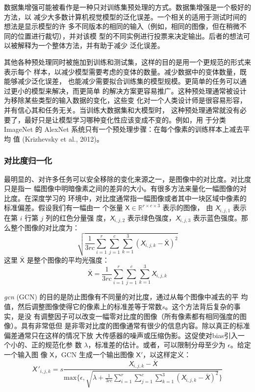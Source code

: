 数据集增强可能被看作是一种只对训练集预处理的方式。数据集增强是一个极好的方法，以
减少大多数计算机视觉模型的泛化误差。一个相关的适用于测试时间的想法是显示模型的许
多不同版本的相同的输入（例如，相同的图像，但在稍微不同的位置进行裁切），并对该模
型的不同实例进行投票来决定输出。后者的想法可以被解释为一个整体方法，并有助于减少
泛化误差。

其他各种预处理同时被施加到训练和测试集，这样的目的是用一个更规范的形式来表示每个
样本，以减少模型需要考虑的变体的数量。减少数据中的变体数量，既能够减少泛化误差，
也能减少需要拟合训练集的模型规模。更简单的任务可以通过更小的模型来解决，而更简单
的解决方案更容易推广。这种预处理通常被设计为移除某些类型的输入数据的变化，这些变
化对一个人类设计师是很容易形容，并有信心其和任务无关。当训练大数据集和大模型时，
这种预处理通常就没有必要了，最好只是让模型学习哪种变化性应该变成不变的。例如，用
于分类 ImageNet 的 AlexNet 系统只有一个预处理步骤：在每个像素的训练样本上减去平均
值 (Krizhevsky et al., 2012)。

\subsubsection{对比度归一化}
\label{subsubsec:contrast_nomalization}

最明显的、对许多任务可以安全移除的变化来源之一，是图像中的对比度。对比度只是指一
幅图像中明暗像素之间的差异的大小。有很多方法来量化一幅图像的对比度。在深度学习的
环境中，对比度通常指一幅图像或者其中一块区域中像素的标准偏差。假设我们有一幅由一
个张量 $\mathsf{X} \in \mathbb{R}^{r \times c \times 3}$ 表示的图像，
由 $\mathsfit{X}_{i,j,1}$ 表示在第 $i$ 行第 $j$ 列的红色分量强
度，$\mathsfit{X}_{i,j,2}$ 表示绿色强度，$\mathsfit{X}_{i,j,3}$ 表示蓝色强度。那
么整个图像的对比度为：
\begin{equation}
\sqrt{\frac{1}{3rc}\displaystyle\sum_{i=1}^r\sum_{j=1}^c\sum_{k=1}^3(\mathsfit{X}_{i,j,k}
  - \bar{\pmb{\mathsf{X}}})^2}
\end{equation}
这里 $\bar{\pmb{\mathsf{X}}}$ 是整个图像的平均光强度：
\begin{equation}
  \bar{\pmb{\mathsf{X}}} = \frac{1}{3rc}\displaystyle\sum_{i=1}^r\sum_{j=1}^c\sum_{k=1}^3\mathsfit{X}_{i,j,k}
\end{equation}

\emph{\gls{gcn}} (GCN) 的目的是防止图像有不同量的对比度，通过从每个图像中减去的平
均值，然后调整图像使得它的像素上的标准差等于常数$s$。这个方法背后复杂的事实，是没
有调整因子可以改变一幅零对比度的图像（所有像素都有相同强度的图像）。具有非常低但
是非零对比度的图像通常有很少的信息内容。除以真正的标准偏差通常只在这样的情况下放
大传感器的噪声或压缩伪影。这促使对\gls*{bias}引入一个小的、正的规范化参
数 $\lambda$，标准差的估计。或者，可以限制分母至少为 $\epsilon$。给定一个输入图
像 $\pmb{\mathsf{X}}$，GCN 生成一个输出图像 $\pmb{\mathsf{X}}'$，以这样定义：
\begin{equation}
  \mathsfit{X}\,'_{i,j,k} = s \frac{
    \mathsfit{X}_{i,j,k} - \bar{\mathsfit{X}}
  }{
    \mathrm{max}\bigg\{\epsilon, \sqrt{\lambda + \frac{1}{3rc}\sum_{i=1}^r\sum_{j=1}^c\sum_{k=1}^3(\mathsfit{X}_{i,j,k} - \bar{\mathsfit{X}})^2}\bigg\}
    }
\end{equation}

